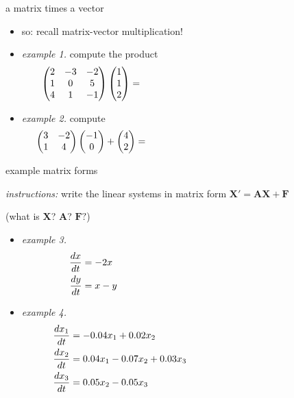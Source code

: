 \documentclass[dvipsnames,colorlinks]{beamer}
\newcommand{\bA}{\mathbf{A}}
\newcommand{\bF}{\mathbf{F}}
\newcommand{\bX}{\mathbf{X}}
\begin{document}
\begin{frame}{a matrix times a vector}

\begin{itemize}
\item so: \alert{recall matrix-vector multiplication!}
\item \emph{example 1.}  compute the product
    $$\begin{pmatrix} 2 & -3 & -2 \\ 1 & 0 & 5 \\ 4 & 1 & -1\end{pmatrix} \begin{pmatrix} 1 \\ 1 \\ 2 \end{pmatrix} = \hspace{70mm}$$

\vspace{15mm}
\item \emph{example 2.}  compute
    $$\begin{pmatrix} 3 & -2 \\ 1 & 4 \end{pmatrix} \begin{pmatrix} -1 \\ 0 \end{pmatrix} +  \begin{pmatrix} 4 \\ 2 \end{pmatrix} = \hspace{70mm}$$
\end{itemize}

\vspace{15mm}
\end{frame}


\begin{frame}{example matrix forms}

\small
\noindent \emph{instructions:} write the linear systems in matrix form $\bX' = \bA\bX + \bF$

(what is $\bX$? $\bA$? $\bF?$)
\begin{itemize}
\item \emph{example 3.}
\begin{align*}
\frac{dx}{dt} &= - 2 x \hspace{70mm} \\
\frac{dy}{dt} &= x - y
\end{align*}
\item \emph{example 4.}
\begin{align*}
\frac{dx_1}{dt} &= -0.04 x_1 + 0.02 x_2 \hspace{60mm} \\
\frac{dx_2}{dt} &= 0.04 x_1 - 0.07 x_2 + 0.03 x_3 \\
\frac{dx_3}{dt} &= 0.05 x_2 - 0.05 x_3
\end{align*}
\end{itemize}
\end{frame}
\end{document}
